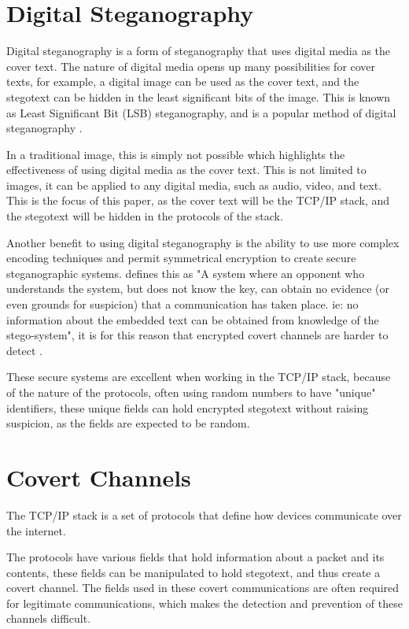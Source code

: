 \section{Digital Steganography}

Digital steganography is a form of steganography that uses digital media as the cover text. The nature of digital media opens up many possibilities for cover texts, for example, a digital image can be used as the cover text, and the stegotext can be hidden in the least significant bits of the image. This is known as Least Significant Bit (LSB) steganography, and is a popular method of digital steganography \citep{AESTfHD}.

In a traditional image, this is simply not possible which highlights the effectiveness of using digital media as the cover text. This is not limited to images, it can be applied to any digital media, such as audio, video, and text. This is the focus of this paper, as the cover text will be the TCP/IP stack, and the stegotext will be hidden in the protocols of the stack.

Another benefit to using digital steganography is the ability to use more complex encoding techniques and permit symmetrical encryption to create secure steganographic systems. \cite{SaW} defines this as "A system where an opponent who understands the system, but does not know the key, can obtain no evidence (or even grounds for suspicion) that a communication has taken place. ie: no information about the embedded text can be obtained from knowledge of the stego-system", it is for this reason that encrypted covert channels are harder to detect \citep{CCitTCPIPPS}.

These secure systems are excellent when working in the TCP/IP stack, because of the nature of the protocols, often using random numbers to have "unique" identifiers, these unique fields can hold encrypted stegotext without raising suspicion, as the fields are expected to be random.

\section{Covert Channels}

The TCP/IP stack is a set of protocols that define how devices communicate over the internet.

The protocols have various fields that hold information about a packet and its contents, these fields can be manipulated to hold stegotext, and thus create a covert channel. The fields used in these covert communications are often required for legitimate communications, which makes the detection and prevention of these channels difficult.

